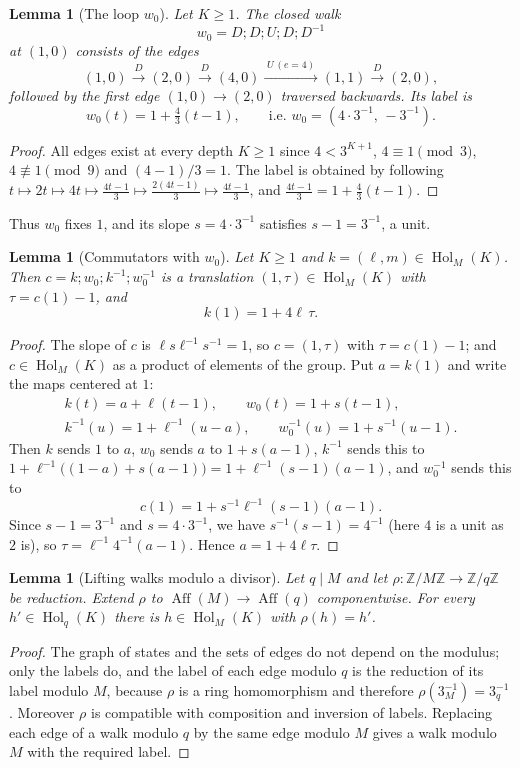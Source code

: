 \documentclass[11pt,reqno,oneside]{amsart}
\theoremstyle{plain}
\newtheorem{lemma}[theorem]{Lemma}
\theoremstyle{definition}
\numberwithin{equation}{section}
\newcommand{\Z}{\mathbb{Z}}
\newcommand{\ZM}{\Z/M\Z}
\newcommand{\Zq}{\Z/q\Z}
\DeclareMathOperator{\Hol}{Hol}
\DeclareMathOperator{\Aff}{Aff}
\newcommand{\then}{\mathbin{;}}
\begin{document}
\begin{lemma}[The loop $w_0$]\label{lem:w0}
Let $K\ge1$. The closed walk
\[
w_0=D\then D\then U\then D\then D^{-1}
\]
at $(1,0)$ consists of the edges
\[
(1,0)\xrightarrow{\;D\;}(2,0)\xrightarrow{\;D\;}(4,0)\xrightarrow{\;U\,(e=4)\;}(1,1)\xrightarrow{\;D\;}(2,0),
\]
followed by the first edge $(1,0)\to(2,0)$ traversed backwards. Its label is
\[
w_0(t)=1+\tfrac43(t-1),\qquad\text{i.e. } w_0=(4\cdot3^{-1},\,-3^{-1}).
\]
\end{lemma}
\begin{proof}
All edges exist at every depth $K\ge1$ since $4<3^{K+1}$, $4\equiv1\pmod 3$, $4\not\equiv1\pmod 9$ and $(4-1)/3=1$. The label is obtained by following $t\mapsto2t\mapsto4t\mapsto\frac{4t-1}{3}\mapsto\frac{2(4t-1)}{3}\mapsto\frac{4t-1}{3}$, and $\frac{4t-1}{3}=1+\frac43(t-1)$.
\end{proof}

Thus $w_0$ fixes $1$, and its slope $s=4\cdot3^{-1}$ satisfies $s-1=3^{-1}$, a unit.

\begin{lemma}[Commutators with $w_0$]\label{lem:comm}
Let $K\ge1$ and $k=(\ell,m)\in\Hol_M(K)$. Then $c=k\then w_0\then k^{-1}\then w_0^{-1}$ is a translation $(1,\tau)\in\Hol_M(K)$ with $\tau=c(1)-1$, and
\[
k(1)=1+4\ell\,\tau .
\]
\end{lemma}
\begin{proof}
The slope of $c$ is $\ell s\ell^{-1}s^{-1}=1$, so $c=(1,\tau)$ with $\tau=c(1)-1$; and $c\in\Hol_M(K)$ as a product of elements of the group. Put $a=k(1)$ and write the maps centered at $1$:
\[
\begin{gathered}
k(t)=a+\ell(t-1),\qquad w_0(t)=1+s(t-1),\\
k^{-1}(u)=1+\ell^{-1}(u-a),\qquad w_0^{-1}(u)=1+s^{-1}(u-1).
\end{gathered}
\]
Then $k$ sends $1$ to $a$, $w_0$ sends $a$ to $1+s(a-1)$, $k^{-1}$ sends this to $1+\ell^{-1}\bigl((1-a)+s(a-1)\bigr)=1+\ell^{-1}(s-1)(a-1)$, and $w_0^{-1}$ sends this to
\[
c(1)=1+s^{-1}\ell^{-1}(s-1)(a-1).
\]
Since $s-1=3^{-1}$ and $s=4\cdot3^{-1}$, we have $s^{-1}(s-1)=4^{-1}$ (here $4$ is a unit as $2$ is), so $\tau=\ell^{-1}4^{-1}(a-1)$. Hence $a=1+4\ell\tau$.
\end{proof}

\begin{lemma}[Lifting walks modulo a divisor]\label{lem:lift}
Let $q\mid M$ and let $\rho\colon\ZM\to\Zq$ be reduction. Extend $\rho$ to $\Aff(M)\to\Aff(q)$ componentwise. For every $h'\in\Hol_q(K)$ there is $h\in\Hol_M(K)$ with $\rho(h)=h'$.
\end{lemma}
\begin{proof}
The graph of states and the sets of edges do not depend on the modulus; only the labels do, and the label of each edge modulo $q$ is the reduction of its label modulo $M$, because $\rho$ is a ring homomorphism and therefore $\rho(3^{-1}_M)=3^{-1}_q$. Moreover $\rho$ is compatible with composition and inversion of labels. Replacing each edge of a walk modulo $q$ by the same edge modulo $M$ gives a walk modulo $M$ with the required label.
\end{proof}
\end{document}
